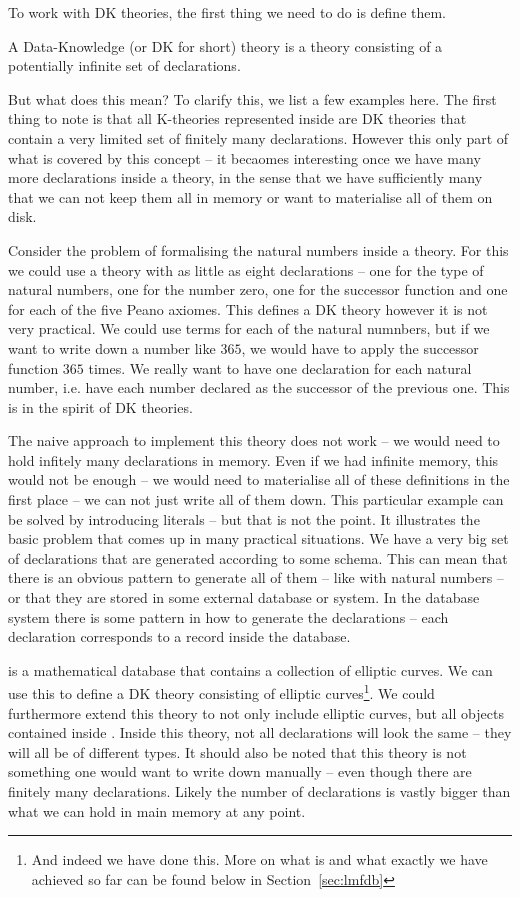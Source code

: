 To work with DK theories, the first thing we need to do is define them.
\begin{mydef}[DK theory]
  A Data-Knowledge (or DK for short) theory is a theory consisting of a potentially
  infinite set of declarations.
\end{mydef}

But what does this mean? To clarify this, we list a few examples here. The first thing to
note is that all K-theories represented inside \MMT are DK theories that contain a very
limited set of finitely many declarations. However this only part of what is covered by
this concept -- it becaomes interesting once we have many more declarations inside a
theory, in the sense that we have sufficiently many that we can not keep them all in
memory or want to materialise all of them on disk.

Consider the problem of formalising the natural numbers inside a theory. For this we could
use a theory with as little as eight declarations -- one for the type of natural numbers,
one for the number zero, one for the successor function and one for each of the five Peano
axiomes. This defines a DK theory however it is not very practical. We could use terms for
each of the natural numnbers, but if we want to write down a number like $365$, we would
have to apply the successor function $365$ times. We really want to have one declaration
for each natural number, i.e. have each number declared as the successor of the previous
one. This is in the spirit of DK theories.

The naive approach to implement this theory does not work -- we would need to hold
infitely many declarations in memory. Even if we had infinite memory, this would not be
enough -- we would need to materialise all of these definitions in the first place -- we
can not just write all of them down. This particular example can be solved by introducing
literals -- but that is not the point. It illustrates the basic problem that comes up in
many practical situations. We have a very big set of declarations that are generated
according to some schema. This can mean that there is an obvious pattern to generate all
of them -- like with natural numbers -- or that they are stored in some external database
or system. In the database system there is some pattern in how to generate the
declarations -- each declaration corresponds to a record inside the database.

\LMFDB is a mathematical database that contains a collection of elliptic curves. We can use
this to define a DK theory consisting of elliptic curves\footnote{And indeed we have done
  this. More on what \LMFDB is and what exactly we have achieved so far can be found below
  in Section~\ref{sec:lmfdb}}. We could furthermore extend this theory to not only include
elliptic curves, but all objects contained inside \LMFDB. Inside this theory, not all
declarations will look the same -- they will all be of different types. It should also be
noted that this theory is not something one would want to write down manually -- even
though there are finitely many declarations. Likely the number of declarations is vastly
bigger than what we can hold in main memory at any point.

